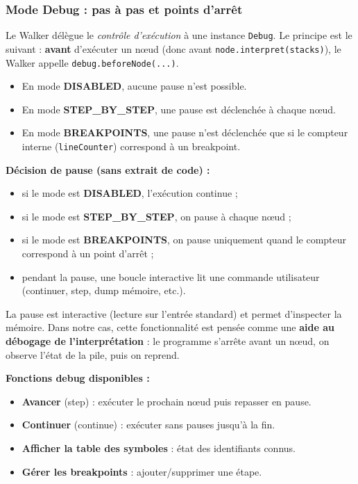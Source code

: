 \subsubsection{Mode Debug : pas à pas et points d'arrêt}

Le Walker délègue le \emph{contrôle d'exécution} à une instance \texttt{Debug}. Le principe est le suivant : \textbf{avant} d'exécuter un nœud (donc avant \texttt{node.interpret(stacks)}), le Walker appelle \texttt{debug.beforeNode(...)}.

\begin{itemize}
    \item En mode \textbf{DISABLED}, aucune pause n'est possible.
    \item En mode \textbf{STEP\_BY\_STEP}, une pause est déclenchée à chaque nœud.
    \item En mode \textbf{BREAKPOINTS}, une pause n'est déclenchée que si le compteur interne (\texttt{lineCounter}) correspond à un breakpoint.
\end{itemize}

\noindent\textbf{Décision de pause (sans extrait de code) :}
\begin{itemize}
    \item si le mode est \textbf{DISABLED}, l'exécution continue ;
    \item si le mode est \textbf{STEP\_BY\_STEP}, on pause à chaque nœud ;
    \item si le mode est \textbf{BREAKPOINTS}, on pause uniquement quand le compteur correspond à un point d'arrêt ;
    \item pendant la pause, une boucle interactive lit une commande utilisateur (continuer, step, dump mémoire, etc.).
\end{itemize}

La pause est interactive (lecture sur l'entrée standard) et permet d'inspecter la mémoire. Dans notre cas, cette fonctionnalité est pensée comme une \textbf{aide au débogage de l'interprétation} : le programme s'arrête avant un nœud, on observe l'état de la pile, puis on reprend.

\noindent\textbf{Fonctions debug disponibles :}
\begin{itemize}
    \item \textbf{Avancer} (step) : exécuter le prochain nœud puis repasser en pause.
    \item \textbf{Continuer} (continue) : exécuter sans pauses jusqu'à la fin.
    \item \textbf{Afficher la table des symboles} : état des identifiants connus.
    \item \textbf{Gérer les breakpoints} : ajouter/supprimer une étape.
\end{itemize}


